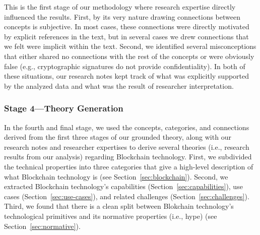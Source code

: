 
This is the first stage of our methodology where research expertise directly influenced the results.
First, by its very nature drawing connections between concepts is subjective.
In most cases, these connections were directly motivated by explicit references in the text, but in several cases we drew connections that we felt were implicit within the text.
Second, we identified several misconceptions that either shared no connections with the rest of the concepts or were obviously false (e.g., cryptographic signatures do not provide confidentiality).
In both of these situations, our research notes kept track of what was explicitly supported by the analyzed data and what was the result of researcher interpretation.

\subsubsection{Stage 4---Theory Generation}
In the fourth and final stage, we used the concepts, categories, and connections derived from the first three stages of our grounded theory, along with our research notes and researcher expertises to derive several theories (i.e., research results from our analysis) regarding Blockchain technology.
First, we subdivided the technical properties into three categories that give a high-level description of what Blockchain technology is (see Section~\ref{sec:blockchain}).
Second, we extracted Blockchain technology's capabilities (Section~\ref{sec:capabilities}), use cases (Section~\ref{sec:use-cases}), and related challenges (Section~\ref{sec:challenges}).
Third, we found that there is a clean split between Blokchain technology's technological primitives and its normative properties (i.e., hype) (see Section~\ref{sec:normative}).


